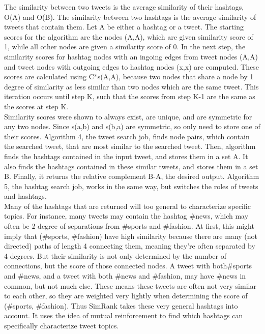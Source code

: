 \documentclass[10pt]{article}
\begin{document}
\begin{itemize}
\begin{itemize}
The similarity between two tweets is the average similarity of their hashtags, O(A) and O(B). The similarity between two hashtags is the average similarity of tweets that contain them. Let A be either a hashtag or a tweet. The starting scores for the algorithm are the nodes (A,A), which are given similarity score of 1, while all other nodes are given a similarity score of 0. In the next step, the similarity scores for hashtag nodes with an ingoing edges from tweet nodes (A,A) and tweet nodes with outgoing edges to hashtag nodes (x,x) are computed. These scores are calculated using C*s(A,A), because two nodes that share a node by 1 degree of similarity as less similar than two nodes which are the same tweet. This iteration occurs until step K, such that the scores from step K-1 are the same as the scores at step K. \\

Similarity scores were shown to always exist, are unique, and are symmetric for any two nodes. Since s(a,b) and s(b,a) are symmetric, so only need to store one of their scores. Algorithm 4, the tweet search job, finds node pairs, which contain the searched tweet, that are most similar to the searched tweet. Then, algorithm finds the hashtags contained in the input tweet, and stores them in a set A. It also finds the hashtags contained in these similar tweets, and stores them in a set B. Finally, it returns the relative complement B-A, the desired output. Algorithm 5, the hashtag search job, works in the same way, but switches the roles of tweets and hashtags. \\

Many of the hashtags that are returned will too general to characterize specific topics. For instance, many tweets may contain the hashtag \#news, which may often be 2 degree of separations from \#sports and \#fashion. At first, this might imply that (\#sports, \#fashion) have high similarity because there are many (not directed) paths of length 4 connecting them, meaning they're often separated by 4 degrees. But their similarity is not only determined by the number of connections, but the score of those connected nodes. A tweet with both\#sports and \#news, and a tweet with both \#news and \#fashion, may have \#news in common, but not much else. These means these tweets are often not very similar to each other, so they are weighted very lightly when determining the score of (\#sports, \#fashion). Thus SimRank takes these very general hashtags into account. It uses the idea of mutual reinforcement to find which hashtags can specifically characterize tweet topics. \\


\end{itemize}
\end{itemize}
\end{document}
